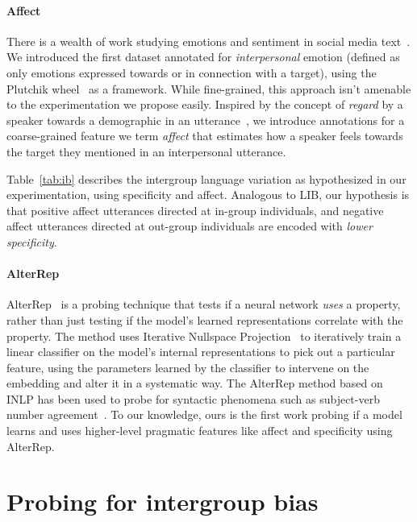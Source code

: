 

\paragraph{Affect} There is a wealth of work studying emotions and sentiment in social media text~\citep{mohammad-2012-emotional,6406313, Mohammad2015UsingHT, abdul-mageed-ungar-2017-emonet,desai-etal-2020-detecting,demszky-etal-2020-goemotions}. We introduced the first dataset annotated for \emph{interpersonal} emotion (defined as only emotions expressed towards or in connection with a target), using the Plutchik wheel~\citep{plutchik2001nature} as a framework. While fine-grained, this approach isn't amenable to the experimentation we propose easily. Inspired by the concept of \emph{regard} by a speaker towards a demographic in an utterance~\citep{sheng-etal-2019-woman}, we introduce annotations for a coarse-grained feature we term \emph{affect} that estimates how a speaker feels towards the target they mentioned in an interpersonal utterance.

Table~\ref{tab:ib} describes the intergroup language variation as hypothesized in our experimentation, using specificity and affect. Analogous to LIB, our hypothesis is that positive affect utterances directed at in-group individuals, and negative affect utterances directed at out-group individuals are encoded with \emph{lower specificity}.

\paragraph{AlterRep} AlterRep~\citep{ravfogel-etal-2021-counterfactual} is a probing technique that tests if a neural network \emph{uses} a property, rather than just testing if the model's learned representations correlate with the property. The method uses Iterative Nullspace Projection~\citep[INLP;][]{ravfogel-etal-2020-null} to iteratively train a linear classifier on the model's internal representations to pick out a particular feature, using the parameters learned by the classifier to intervene on the embedding and alter it in a systematic way. The AlterRep method based on INLP has been used to probe for syntactic phenomena such as subject-verb number agreement~\citep{ravfogel-etal-2021-counterfactual}. To our knowledge, ours is the first work probing if a model learns and uses higher-level pragmatic features like affect and specificity using AlterRep.

\section{Probing for intergroup bias}

